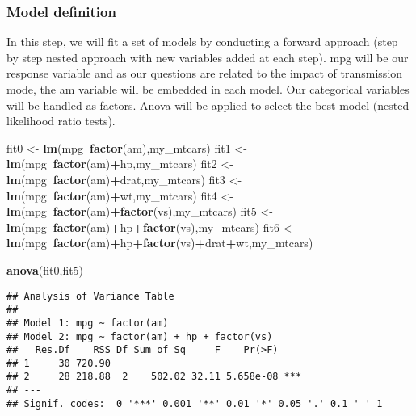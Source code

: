 \documentclass[
]{article}
\newenvironment{Shaded}{\begin{snugshade}}{\end{snugshade}}
\newcommand{\KeywordTok}[1]{\textcolor[rgb]{0.13,0.29,0.53}{\textbf{#1}}}
\newcommand{\NormalTok}[1]{#1}
\newcommand{\OperatorTok}[1]{\textcolor[rgb]{0.81,0.36,0.00}{\textbf{#1}}}
\newcommand{\StringTok}[1]{\textcolor[rgb]{0.31,0.60,0.02}{#1}}
\begin{document}
\hypertarget{model-definition}{%
\subsubsection{Model definition}\label{model-definition}}

In this step, we will fit a set of models by conducting a forward
approach (step by step nested approach with new variables added at each
step). mpg will be our response variable and as our questions are
related to the impact of transmission mode, the am variable will be
embedded in each model. Our categorical variables will be handled as
factors. Anova will be applied to select the best model (nested
likelihood ratio tests).\\

\begin{Shaded}
\begin{Highlighting}[]
\NormalTok{fit0 <-}\StringTok{ }\KeywordTok{lm}\NormalTok{(mpg}\OperatorTok{~}\KeywordTok{factor}\NormalTok{(am),my_mtcars)}
\NormalTok{fit1 <-}\StringTok{ }\KeywordTok{lm}\NormalTok{(mpg}\OperatorTok{~}\KeywordTok{factor}\NormalTok{(am)}\OperatorTok{+}\NormalTok{hp,my_mtcars)}
\NormalTok{fit2 <-}\StringTok{ }\KeywordTok{lm}\NormalTok{(mpg}\OperatorTok{~}\KeywordTok{factor}\NormalTok{(am)}\OperatorTok{+}\NormalTok{drat,my_mtcars)}
\NormalTok{fit3 <-}\StringTok{ }\KeywordTok{lm}\NormalTok{(mpg}\OperatorTok{~}\KeywordTok{factor}\NormalTok{(am)}\OperatorTok{+}\NormalTok{wt,my_mtcars)}
\NormalTok{fit4 <-}\StringTok{ }\KeywordTok{lm}\NormalTok{(mpg}\OperatorTok{~}\KeywordTok{factor}\NormalTok{(am)}\OperatorTok{+}\KeywordTok{factor}\NormalTok{(vs),my_mtcars)}
\NormalTok{fit5 <-}\StringTok{ }\KeywordTok{lm}\NormalTok{(mpg}\OperatorTok{~}\KeywordTok{factor}\NormalTok{(am)}\OperatorTok{+}\NormalTok{hp}\OperatorTok{+}\KeywordTok{factor}\NormalTok{(vs),my_mtcars)}
\NormalTok{fit6 <-}\StringTok{ }\KeywordTok{lm}\NormalTok{(mpg}\OperatorTok{~}\KeywordTok{factor}\NormalTok{(am)}\OperatorTok{+}\NormalTok{hp}\OperatorTok{+}\KeywordTok{factor}\NormalTok{(vs)}\OperatorTok{+}\NormalTok{drat}\OperatorTok{+}\NormalTok{wt,my_mtcars)}

\KeywordTok{anova}\NormalTok{(fit0,fit5)}
\end{Highlighting}
\end{Shaded}

\begin{verbatim}
## Analysis of Variance Table
## 
## Model 1: mpg ~ factor(am)
## Model 2: mpg ~ factor(am) + hp + factor(vs)
##   Res.Df    RSS Df Sum of Sq     F    Pr(>F)    
## 1     30 720.90                                 
## 2     28 218.88  2    502.02 32.11 5.658e-08 ***
## ---
## Signif. codes:  0 '***' 0.001 '**' 0.01 '*' 0.05 '.' 0.1 ' ' 1
\end{verbatim}
\end{document}
